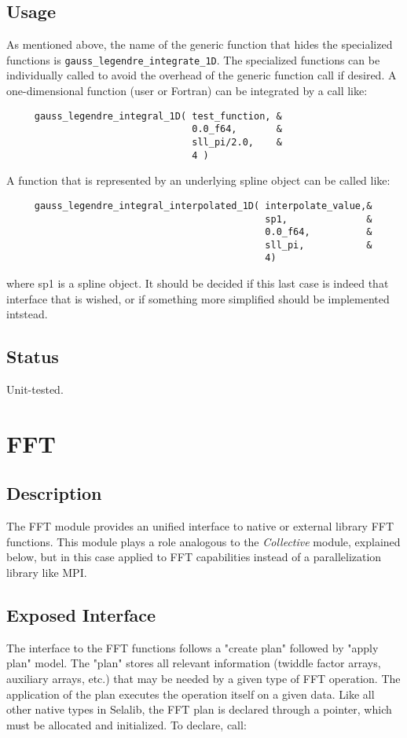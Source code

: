 \documentclass[]{report}   %
\begin{document}
\subsection{Usage}
As mentioned above, the name of the generic function that hides the specialized functions is \verb+gauss_legendre_integrate_1D+. The specialized functions can be individually called to avoid the overhead of the generic function call if desired. A one-dimensional function (user or Fortran) can be integrated by a call like:
\begin{verbatim}
     gauss_legendre_integral_1D( test_function, &
                                 0.0_f64,       &
                                 sll_pi/2.0,    &
                                 4 )
\end{verbatim}
A function that is represented by an underlying spline object can be called like:
\begin{verbatim}
     gauss_legendre_integral_interpolated_1D( interpolate_value,&
                                              sp1,              &
                                              0.0_f64,          &
                                              sll_pi,           &
                                              4)
\end{verbatim}
where sp1 is a spline object. It should be decided if this last case is indeed that interface that is wished, or if something more simplified should be implemented intstead.
\subsection{Status}
Unit-tested.


\section{FFT}
\subsection{Description}
The FFT module provides an unified interface to native or external library FFT functions. This module plays a role analogous to the \emph{Collective} module, explained below, but in this case applied to FFT capabilities instead of a parallelization library like MPI.

\subsection{Exposed Interface}
The interface to the FFT functions follows a "create plan" followed by "apply plan" model. The "plan" stores all relevant information (twiddle factor arrays, auxiliary arrays, etc.) that may be needed by a given type of FFT operation. The application of the plan executes the operation itself on a given data. Like all other native types in Selalib, the FFT plan is declared through a pointer, which must be allocated and initialized. To declare, call:
\end{document}
